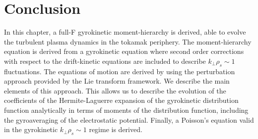 \section{Conclusion}
%
In this chapter, a full-F gyrokinetic moment-hierarchy is derived, able to evolve the turbulent plasma dynamics in the tokamak periphery.
%
The moment-hierarchy equation is derived from a gyrokinetic equation where second order corrections with respect to the drift-kinetic equations are included to describe $k_\perp \rho_s \sim 1$ fluctuations.
%
The equations of motion are derived by using the perturbation approach provided by the Lie transform framework.
%
We describe the main elements of this approach.
%
This allows us to describe the evolution of the coefficients of the Hermite-Laguerre expansion of the gyrokinetic distribution function analytically in terms of moments of the distribution function, including the gyroaveraging of the electrostatic potential.
%
Finally, a Poisson's equation valid in the gyrokinetic $k_\perp \rho_s \sim 1$ regime is derived.